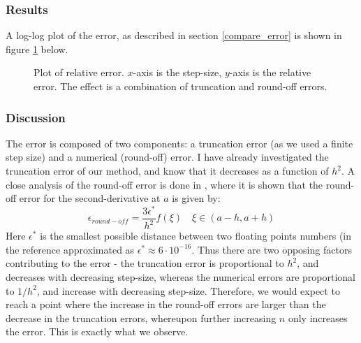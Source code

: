 \documentclass[a4paper, 10pt]{article}
\begin{document}
\subsubsection{Results}
A log-log plot of the error, as described in section \ref{compare_error} is shown in figure \ref{fig:figure_3} below.
\begin{center}
\begin{figure}[h]
\caption{Plot of relative error. $x$-axis is the step-size, $y$-axis is the relative error. The effect is a combination of truncation and round-off errors.} 
\label{fig:figure_3}
\end{figure}
\end{center}
\subsubsection{Discussion}
The error is composed of two components: a truncation error (as we used a finite step size) and a numerical (round-off) error. I have already investigated the truncation error of our method, and know that it decreases as a function of $h^2$. A close analysis of the round-off error is done in \cite{Morken}, where it is shown that the round-off error for the second-derivative at $a$ is given by:
\begin{equation}
\epsilon_{round-off} = \frac{3\epsilon^*}{h^2}f(\xi) \quad \xi \in (a-h, a+h)
\end{equation}
Here $\epsilon^*$ is the smallest possible distance between two floating points numbers (in the reference approximated as $\epsilon^* \approx 6\cdot 10^{-16}$. Thus there are two opposing factors contributing to the error - the truncation error is proportional to $h^2$, and decreases with decreasing step-size, whereas the numerical errors are proportional to $1/h^2$, and increase with decreasing step-size. Therefore, we would expect to reach a point where the increase in the round-off errors are larger than the decrease in the truncation errors, whereupon further increasing $n$ only increases the error. This is exactly what we observe.
\end{document}
